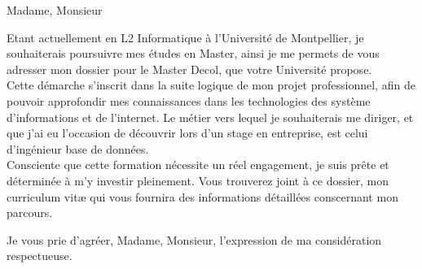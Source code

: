 \documentclass[10pt,stdletter]{newlfm}
\begin{document}
\begin{newlfm}


Madame, Monsieur \par
Etant actuellement en L2 Informatique à l'Université de Montpellier, je souhaiterais poursuivre mes études en Master, ainsi je me permets de vous adresser mon dossier pour le Master Decol, que votre Université propose.\\
   Cette démarche s'inscrit dans la suite logique de mon projet professionnel, afin de pouvoir approfondir mes connaissances dans les technologies des système d'informations et de l'internet. Le métier vers lequel je souhaiterais me diriger, et que j'ai eu l'occasion de découvrir lors d'un stage en entreprise, est celui d'ingénieur base de données.\\
   Consciente que cette formation nécessite un réel engagement, je suis prête et déterminée à m'y investir pleinement. Vous trouverez joint à ce dossier, mon curriculum vitæ qui vous fournira des informations détaillées conscernant mon parcours. \par

Je vous prie d'agréer, Madame, Monsieur, l'expression de ma considération respectueuse.
\end{newlfm}
\end{document}
